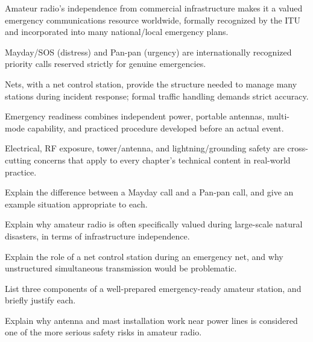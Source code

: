 \begin{quickreview}
\item Amateur radio's independence from commercial infrastructure makes
it a valued emergency communications resource worldwide, formally
recognized by the ITU and incorporated into many national/local
emergency plans.
\item Mayday/SOS (distress) and Pan-pan (urgency) are internationally
recognized priority calls reserved strictly for genuine emergencies.
\item Nets, with a net control station, provide the structure needed to
manage many stations during incident response; formal traffic handling
demands strict accuracy.
\item Emergency readiness combines independent power, portable
antennas, multi-mode capability, and practiced procedure developed
before an actual event.
\item Electrical, RF exposure, tower/antenna, and lightning/grounding
safety are cross-cutting concerns that apply to every chapter's
technical content in real-world practice.
\end{quickreview}

\begin{practiceproblems}
\item Explain the difference between a Mayday call and a Pan-pan call,
and give an example situation appropriate to each.
\item Explain why amateur radio is often specifically valued during
large-scale natural disasters, in terms of infrastructure independence.
\item Explain the role of a net control station during an emergency
net, and why unstructured simultaneous transmission would be
problematic.
\item List three components of a well-prepared emergency-ready amateur
station, and briefly justify each.
\item Explain why antenna and mast installation work near power lines
is considered one of the more serious safety risks in amateur radio.
\end{practiceproblems}
